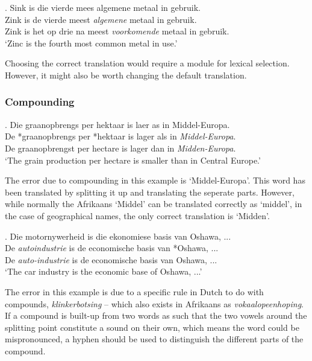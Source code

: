 \documentclass[11pt]{article}
\begin{document}
\ex. \label{ex:expolysem} 
    Sink is die vierde mees algemene metaal in gebruik. \\
    Zink is de vierde meest {\em algemene} metaal in gebruik. \\
    Zink is het op drie na meest {\em voorkomende} metaal in gebruik. \\
    `Zinc is the fourth most common metal in use.' 

Choosing the correct translation would require a module for lexical selection. However, it might also
be worth changing the default translation.

\subsubsection{Compounding}

\ex. \label{ex:excompsplit} 
    Die graanopbrengs per hektaar is laer as in Middel-Europa. \\
    De *graanopbrengs per *hektaar is lager als in {\em Middel-Europa}. \\
    De graanopbrengst per hectare is lager dan in {\em Midden-Europa}. \\
   `The grain production per hectare is smaller than in Central Europe.'

The error due to compounding in this example is `Middel-Europa'. This word has been translated by 
splitting it up and translating the seperate parts.
However, while normally the Afrikaans `Middel' can be translated correctly as `middel', in the 
case of geographical names, the only correct translation is `Midden'.

\ex. \label{ex:excomphyphen} 
    Die motornywerheid is die ekonomiese basis van Oshawa, ...  \\
    De {\em autoindustrie} is de economische basis van *Oshawa, ... \\
    De {\em auto-industrie} is de economische basis van Oshawa, ... \\
   `The car industry is the economic base of Oshawa, ...'

The error in this example is due to a specific rule in Dutch to do with 
compounds, \emph{klinkerbotsing} -- which also exists in Afrikaans 
as \emph{vokaalopeenhoping}. If a compound is built-up from two words as such 
that the two vowels around the splitting point constitute a sound on their own, 
which means the word could be mispronounced, a hyphen should be used to distinguish 
the different parts of the compound. 
\end{document}

